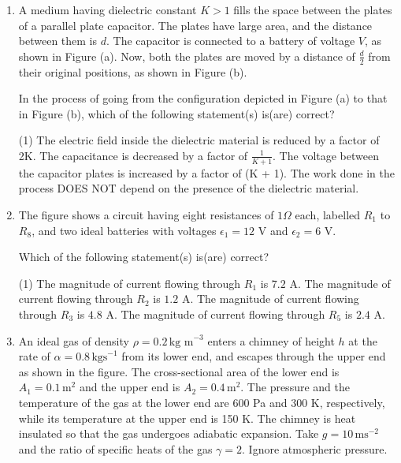 \documentclass{article}
\begin{document}
\begin{enumerate}
    \item A medium having dielectric constant  $K > 1$ fills the space between the plates of a parallel plate capacitor. The plates have large area, and the distance between them is $d$. The capacitor is connected to a battery of voltage $V$, as shown in Figure (a). Now, both the plates are moved by a distance of $\frac{d}{2}$ from their original positions, as shown in Figure (b).
    \begin{center}
    \end{center}
    In the process of going from the configuration depicted in Figure (a) to that in Figure (b), which of the following statement(s) is(are) correct?
    
        \begin{tasks}(1)
            	\task The electric field inside the dielectric material is reduced by a factor of 2K.
            	\task The capacitance is decreased by a factor of $\frac{1}{K+1}$.
            	\task The voltage between the capacitor plates is increased by a factor of (K + 1).
            	\task The work done in the process DOES NOT depend on the presence of the dielectric material.
        \end{tasks}

    \item The figure shows a circuit having eight resistances of \(1 \Omega\) each, labelled \(R_1\) to \(R_8\), and two ideal batteries with voltages \(\epsilon_1 = 12 \text{ V}\) and \(\epsilon_2 = 6 \text{ V}\). 
    \begin{center}
    \end{center}
    Which of the following statement(s) is(are) correct?
        \begin{tasks}(1)
            \task The magnitude of current flowing through \(R_1\) is \(7.2 \text{ A}\).
            \task The magnitude of current flowing through \(R_2\) is \(1.2 \text{ A}\).
            \task The magnitude of current flowing through \(R_3\) is \(4.8 \text{ A}\).
            \task The magnitude of current flowing through \(R_5\) is \(2.4 \text{ A}\).
        \end{tasks}


    \item An ideal gas of density \( \rho = 0.2 \, \text{kg m}^{-3} \) enters a chimney of height \( h \) at the rate of \( \alpha = 0.8 \, \text{kgs}^{-1} \) from its lower end, and escapes through the upper end as shown in the figure. The cross-sectional area of the lower end is \( A_1 = 0.1 \, \text{m}^2 \) and the upper end is \( A_2 = 0.4 \, \text{m}^2 \). The pressure and the temperature of the gas at the lower end are 600 Pa and 300 K, respectively, while its temperature at the upper end is 150 K. The chimney is heat insulated so that the gas undergoes adiabatic expansion. Take \( g = 10 \, \text{ms}^{-2} \) and the ratio of specific heats of the gas \( \gamma = 2 \). Ignore atmospheric pressure.


\end{enumerate}
\end{document}
